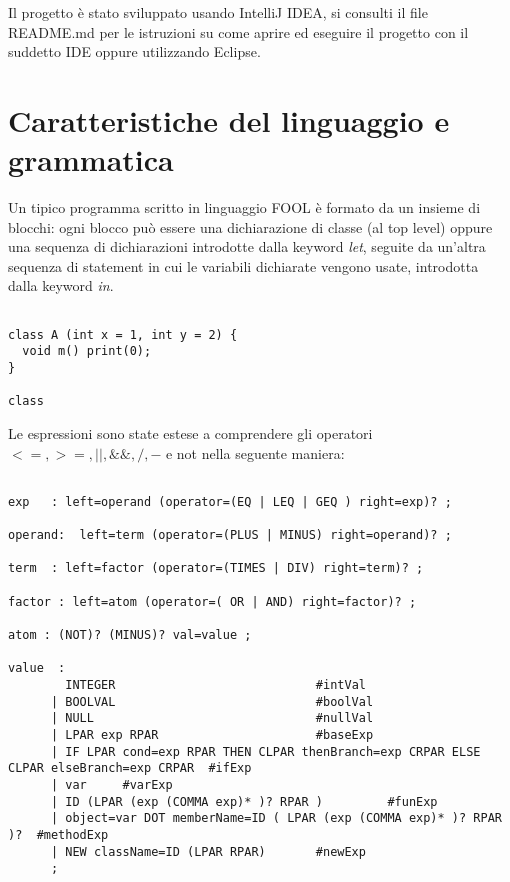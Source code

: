 \documentclass[a4paper]{article}   %
\begin{document}
Il progetto è stato sviluppato usando IntelliJ IDEA, si consulti il file README.md per le istruzioni
su come aprire ed eseguire il progetto con il suddetto IDE oppure utilizzando Eclipse.

\section{Caratteristiche del linguaggio e grammatica}

Un tipico programma scritto in linguaggio FOOL è formato da un insieme di blocchi: ogni blocco può essere una dichiarazione di classe (al top level)
oppure una sequenza di dichiarazioni introdotte dalla keyword \textit{let}, seguite da un'altra sequenza di statement in cui le variabili dichiarate vengono usate, introdotta
dalla keyword \textit{in}.\\


\begin{lstlisting}

class A (int x = 1, int y = 2) {
  void m() print(0);
}

class
\end{lstlisting}

Le espressioni sono state estese a comprendere gli operatori $<=, >=, ||, \&\&, /, - $
   e not nella seguente maniera:\\

\begin{lstlisting}

exp   : left=operand (operator=(EQ | LEQ | GEQ ) right=exp)? ;

operand:  left=term (operator=(PLUS | MINUS) right=operand)? ;

term  : left=factor (operator=(TIMES | DIV) right=term)? ;

factor : left=atom (operator=( OR | AND) right=factor)? ;

atom : (NOT)? (MINUS)? val=value ;

value  :
        INTEGER                            #intVal
      | BOOLVAL                            #boolVal
      | NULL                               #nullVal
      | LPAR exp RPAR                      #baseExp
      | IF LPAR cond=exp RPAR THEN CLPAR thenBranch=exp CRPAR ELSE CLPAR elseBranch=exp CRPAR  #ifExp
      | var     #varExp
      | ID (LPAR (exp (COMMA exp)* )? RPAR )         #funExp
      | object=var DOT memberName=ID ( LPAR (exp (COMMA exp)* )? RPAR )?  #methodExp
      | NEW className=ID (LPAR RPAR)       #newExp
      ;

\end{lstlisting}
\end{document}
